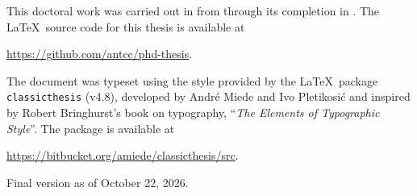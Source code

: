 \pagestyle{empty}

\hfill

\vfill



\begingroup
{}

This doctoral work was carried out in \myLocation from \myStartTime through its completion in \myTime. The \LaTeX\ source code for this thesis is available at 
\begin{center}
\url{https://github.com/antcc/phd-thesis}.
\end{center}

\noindent The document was typeset using the style provided by the \LaTeX\ package \texttt{classicthesis} (v4.8), developed by Andr\'e Miede and Ivo Pletikosić and inspired by Robert Bringhurst's book on typography, ``\emph{The Elements of Typographic Style}''. The package is available at
\begin{center}
\url{https://bitbucket.org/amiede/classicthesis/src}.
\end{center}

\noindent Final version as of October 22, 2026.
\endgroup

%
%
